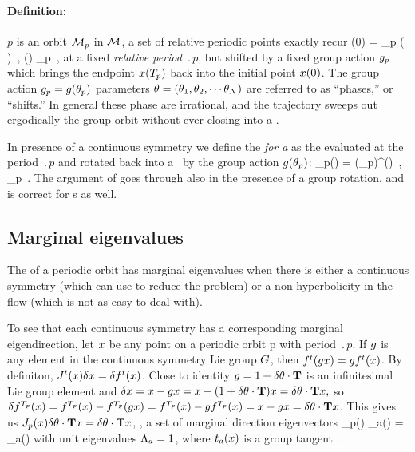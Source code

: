 {\paragraph{Definition:
           \Rpo}
$p$ is an orbit ${\cal M}_p$ in {\statesp} ${\cal M}$, a set of relative periodic
points exactly recur
    \toCB
\beq
\ssp (0) = \LieEl_p \ssp ( )
    \,,\qquad
\ssp (\tau) \in \pS_p
    \,,
\label{RPOrelper1}
\eeq
at a fixed {\em relative period} $\period{p}$, but
shifted by a fixed group action ${g_p}$
which brings the endpoint $x ({T_{p}} ) $
back into the initial point $x (0) $.
The group action ${g_p}=g({\bf \theta}_p)$ parameters  \toCB
${\bf \theta} = ({\bf \theta}_1,{\bf \theta}_2,\cdots{\bf \theta}_N)$
are referred to as ``phases,'' or ``shifts.''
%
In general these phase are irrational, and the trajectory  \toCB
sweeps out ergodically the group orbit without ever closing
into a \po.

In presence of a continuous symmetry we define the
\emph{{\FloquetM} for a \rpo} as the {\jacobianM} evaluated
at the period $\period{p}$ and rotated back into a \po\ by the
group action $g({\bf \theta}_p)$:
    \toCB
\beq
 \jMps_p(\ssp) = \LieEl(\gSpace_p)\jMps^(\ssp)
    \,,\qquad
\ssp  \in \pS_p
\,.
The argument of  goes through also in
the presence of a group rotation,
and  is correct for \rpo s as well.

\subsection{Marginal eigenvalues}

The {\jacobianM} of a periodic orbit has marginal eigenvalues
when there is either a continuous symmetry (which can use to
reduce the problem) or a non-hyperbolicity in the flow (which
is not as easy to deal with).

To see that each continuous symmetry has a corresponding
marginal eigendirection, let $x$ be any point on a periodic
orbit p with period $\period{p}$. If $g$ is any element in
the continuous symmetry Lie group $G$, then $f^t(g x)
= g f^t(x)$. By definiton, $J^t(x)
\delta x = \delta f^t(x)$.
Close to identity $g = 1+\delta
\theta \cdot \mathbf{T}$ is an infinitesimal Lie group element and
$\delta x = x - g x = x - (1+\delta \theta
\cdot \mathbf{T}) x  = \delta \theta \cdot \mathbf{T} x,$
so
$\delta f^{{T_{p}}}(x) = f^{{T_{p}}}(x) -
f^{{T_{p}}}(g x)= f^{{T_{p}}}(x) - g f^{{T_{p}}}(x) =
x - g x = \delta \theta \cdot \mathbf{T} x$.
This gives us
$J_p(x) \delta \theta \cdot \mathbf{T} x = \delta
\theta \cdot \mathbf{T} x$,
\ie, a set of marginal direction eigenvectors
\beq
 \jMps_p(\ssp) \groupTan_{a}(\ssp) =
\groupTan_{a}(\ssp)
with unit eigenvalues $\Lambda_a=1$,
where $t_{a}(x)$ is a group tangent .


}

